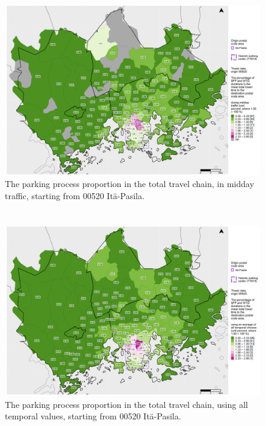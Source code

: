 \begin{figure}
    \section{}
    \centering
    \includegraphics[trim={0.9cm 0.3cm 0.25cm 0.3cm},clip,width=\textwidth]{images/compare_traveltimes_mapfill-msc_m_pct_fromzip-00520_15-10-2020.png}
    \caption[Parking process proportion from Itä-Pasila, midday traffic]{The parking process proportion in the total travel chain, in midday traffic, starting from 00520 Itä-Pasila.}%
    \label{fig:compare_msc_m_pct_00520}%
\end{figure}

\begin{figure}
    \section{}
    \centering
    \includegraphics[trim={0.9cm 0.3cm 0.25cm 0.3cm},clip,width=\textwidth]{images/compare_traveltimes_mapfill-msc_all_pct_fromzip-00520_15-10-2020.png}
    \caption[Parking process proportion from Itä-Pasila, all temporal values]{The parking process proportion in the total travel chain, using all temporal values, starting from 00520 Itä-Pasila.}%
    \label{fig:compare_msc_all_pct_00520}%
\end{figure}

